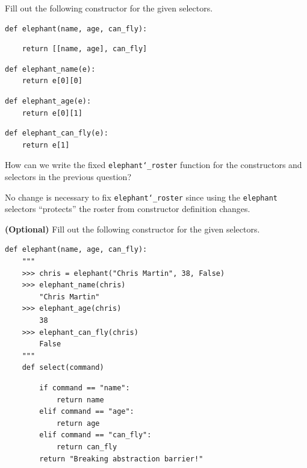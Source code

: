 \documentclass{exam}
\begin{document}
\begin{questions}
\begin{blocksection}
\end{blocksection}


\begin{blocksection}
\question Fill out the following constructor for the given selectors.

\begin{lstlisting}
def elephant(name, age, can_fly):
\end{lstlisting}
\begin{solution}[1in]
\begin{lstlisting}
    return [[name, age], can_fly]
\end{lstlisting}
\end{solution}

\begin{lstlisting}
def elephant_name(e):
    return e[0][0]
\end{lstlisting}

\begin{lstlisting}
def elephant_age(e):
    return e[0][1]
\end{lstlisting}

\begin{lstlisting}
def elephant_can_fly(e):
    return e[1]
\end{lstlisting}

\end{blocksection}


\begin{blocksection}
\question How can we write the fixed \texttt{elephant\char`_roster} function for
the constructors and selectors in the previous question?

\begin{solution}[2in]
No change is necessary to fix \texttt{elephant\char`_roster} since using the
\texttt{elephant} selectors ``protects'' the roster from constructor definition
changes.
\end{solution}

\end{blocksection}

\begin{blocksection}
\question \textbf{(Optional)} Fill out the following constructor for the given
selectors.

\begin{lstlisting}
def elephant(name, age, can_fly):
    """
    >>> chris = elephant("Chris Martin", 38, False)
    >>> elephant_name(chris)
        "Chris Martin"
    >>> elephant_age(chris)
        38
    >>> elephant_can_fly(chris)
        False
    """
    def select(command)
\end{lstlisting}
\begin{solution}[3in]
\begin{lstlisting}
        if command == "name":
            return name
        elif command == "age":
            return age
        elif command == "can_fly":
            return can_fly
        return "Breaking abstraction barrier!"
\end{lstlisting}
\end{solution}


\end{blocksection}
\end{questions}
\end{document}
